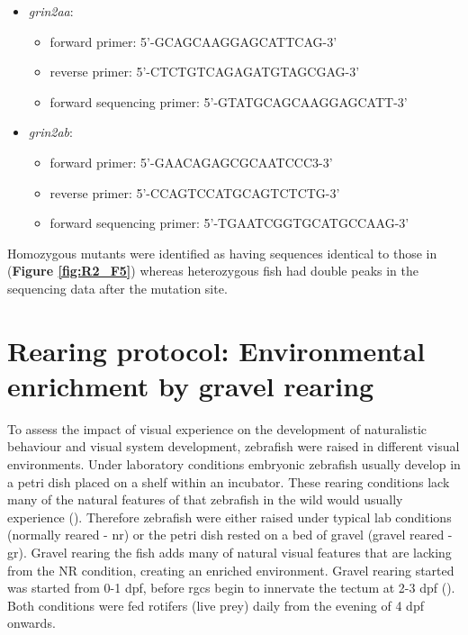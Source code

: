 \begin{itemize}
    \item \textit{grin2aa}:
    \begin{itemize}
        \item  forward primer: 5'-GCAGCAAGGAGCATTCAG-3'
        \item  reverse primer: 5'-CTCTGTCAGAGATGTAGCGAG-3'
        \item  forward sequencing primer: 5'-GTATGCAGCAAGGAGCATT-3'
    \end{itemize}
    \item \textit{grin2ab}:
    \begin{itemize}
        \item   forward primer: 5'-GAACAGAGCGCAATCCC3-3'
        \item   reverse primer: 5'-CCAGTCCATGCAGTCTCTG-3'
        \item  forward sequencing primer: 5'-TGAATCGGTGCATGCCAAG-3'
    \end{itemize}
\end{itemize}
 
 Homozygous mutants were identified as having sequences identical to those in (\textbf{Figure \ref{fig:R2_F5}}) whereas heterozygous fish had double peaks in the sequencing data after the mutation site.

\section{Rearing protocol: Environmental enrichment by gravel rearing}
To assess the impact of visual experience on the development of naturalistic behaviour and visual system development, zebrafish were raised in different visual environments. Under laboratory conditions embryonic zebrafish usually develop in a petri dish placed on a shelf within an incubator. These rearing conditions lack many of the natural features of that zebrafish in the wild would usually experience (\cite{Engeszer2007ZebrafishField}). Therefore zebrafish were either raised under typical lab conditions (normally reared - \acrshort{nr}) or the petri dish rested on a bed of gravel (gravel reared - \acrshort{gr}). Gravel rearing the fish adds many of natural visual features that are lacking from the NR condition, creating an enriched environment. Gravel rearing started was started from 0-1 \gls{dpf}, before \glspl{rgc} begin to innervate the tectum at 2-3 \gls{dpf} (\cite{Burrill1994DevelopmentRerio}). Both conditions were fed rotifers (live prey) daily from the evening of 4 \gls{dpf} onwards.

